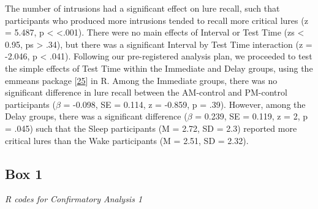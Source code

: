 \documentclass[
]{article}
\begin{document}
The number of intrusions had a significant effect on lure recall, such that participants who produced more intrusions tended to recall more critical lures (z = 5.487, p \textless{} \textless.001). There were no main effects of Interval or Test Time (zs \textless{} 0.95, ps \textgreater{} .34), but there was a significant Interval by Test Time interaction (z = -2.046, p \textless{} .041). Following our pre-registered analysis plan, we proceeded to test the simple effects of Test Time within the Immediate and Delay groups, using the emmeans package {[}\protect\hyperlink{ref-lenth2021a}{25}{]} in R. Among the Immediate groups, there was no significant difference in lure recall between the AM-control and PM-control participants (\(\beta\) = -0.098, SE = 0.114, z = -0.859, p = .39). However, among the Delay groups, there was a significant difference (\(\beta\) = 0.239, SE = 0.119, z = 2, p = .045) such that the Sleep participants (M = 2.72, SD = 2.3) reported more critical lures than the Wake participants (M = 2.51, SD = 2.32).

\hypertarget{box-1}{%
\subsection*{Box 1}\label{box-1}}

\emph{R codes for Confirmatory Analysis 1}
\end{document}
